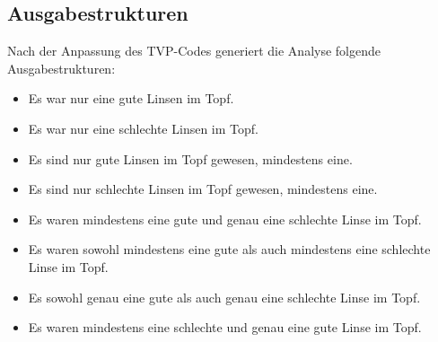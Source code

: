 \subsection{Ausgabestrukturen}
Nach der Anpassung des TVP-Codes generiert die Analyse folgende Ausgabestrukturen:
\begin{itemize}[$\rightarrow$]
	\item Es war nur eine gute Linsen im Topf.
	\item Es war nur eine schlechte Linsen im Topf.
	\item Es sind nur gute Linsen im Topf gewesen, mindestens eine.
	\item Es sind nur schlechte Linsen im Topf gewesen, mindestens eine.
	\item Es waren mindestens eine gute und genau eine schlechte Linse im Topf.
	\item Es waren sowohl mindestens eine gute als auch mindestens eine schlechte Linse im Topf.
	\item Es sowohl genau eine gute als auch genau eine schlechte Linse im Topf.
	\item Es waren mindestens eine schlechte und genau eine gute Linse im Topf.
\end{itemize}